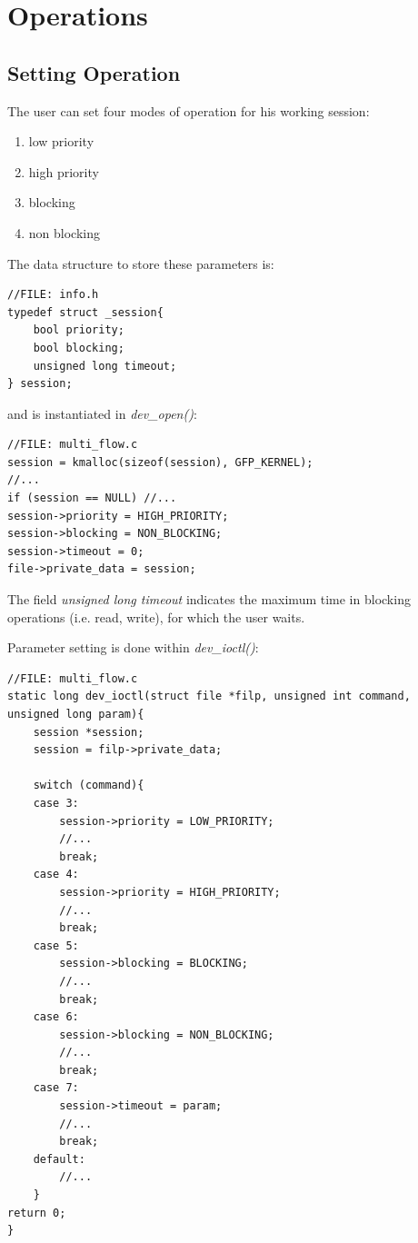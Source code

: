 \documentclass[12pt]{report}
\begin{document}
\chapter{Operations}
\section{Setting Operation}

The user can set four modes of operation for his working session: 

\begin{enumerate}
	\item low priority
	\item high priority
	\item blocking
	\item non blocking
\end{enumerate}

The data structure to store these parameters is:

\begin{lstlisting}
//FILE: info.h
typedef struct _session{
	bool priority;       
	bool blocking;
	unsigned long timeout;
} session;
\end{lstlisting}
and is instantiated in \emph{dev\_open()}:

\begin{lstlisting}
//FILE: multi_flow.c
session = kmalloc(sizeof(session), GFP_KERNEL);
//...
if (session == NULL) //...
session->priority = HIGH_PRIORITY;
session->blocking = NON_BLOCKING;
session->timeout = 0;
file->private_data = session;
\end{lstlisting}

The field \emph{unsigned long timeout} indicates the maximum time in blocking operations (i.e. read, write), for which the user waits.

Parameter setting is done within \emph{dev\_ioctl()}:

\begin{lstlisting}
//FILE: multi_flow.c
static long dev_ioctl(struct file *filp, unsigned int command, unsigned long param){
	session *session;
	session = filp->private_data;
	
	switch (command){
	case 3:
		session->priority = LOW_PRIORITY;
		//...
		break;
	case 4:
		session->priority = HIGH_PRIORITY;
		//...
		break;
	case 5:
		session->blocking = BLOCKING;
		//...
		break;
	case 6:
		session->blocking = NON_BLOCKING;
		//...
		break;
	case 7:
		session->timeout = param;
		//...
		break;
	default:
		//...
	}
return 0;
}
\end{lstlisting}
\end{document}
